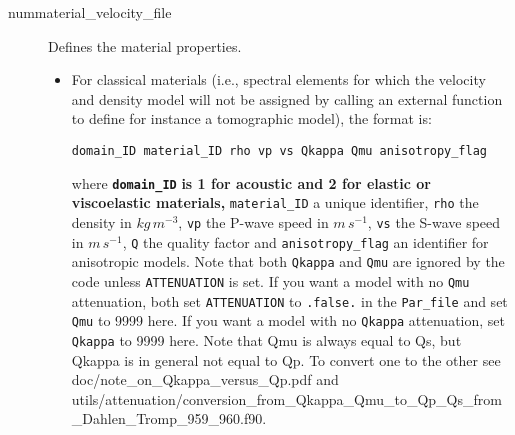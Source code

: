 \begin{description}
\item [{nummaterial\_velocity\_file}] Defines the material properties.

\begin{itemize}
\item For classical materials (i.e., spectral elements for which the velocity
and density model will not be assigned by calling an external function
to define for instance a tomographic model), the format is:

\begin{verbatim}
domain_ID material_ID rho vp vs Qkappa Qmu anisotropy_flag
\end{verbatim}

where \texttt{\textbf{domain\_ID}}\textbf{ is 1 for acoustic and 2
for elastic or viscoelastic materials,} \texttt{material\_ID} a unique
identifier, \texttt{rho} the density in $kg\, m^{-3}$, \texttt{vp}
the P-wave speed in $m\, s^{-1}$, \texttt{vs} the S-wave speed in
$m\, s^{-1}$, \texttt{Q} the quality factor and \texttt{anisotropy\_flag}
an identifier for anisotropic models.
Note that both \texttt{Qkappa} and \texttt{Qmu} are ignored
by the code unless \texttt{ATTENUATION} is set. If you want a model
with no \texttt{Qmu} attenuation, both set \texttt{ATTENUATION} to
\texttt{.false.} in the \texttt{Par\_file} and set \texttt{Qmu} to
9999 here. If you want a model with no \texttt{Qkappa} attenuation, set \texttt{Qkappa} to 9999 here.
Note that Qmu is always equal to Qs, but Qkappa is in general not equal to Qp. To convert one to the other see doc/note\_on\_Qkappa\_versus\_Qp.pdf and utils/attenuation/conversion\_from\_Qkappa\_Qmu\_to\_Qp\_Qs\_from\_Dahlen\_Tromp\_959\_960.f90.


\end{itemize}
\end{description}
